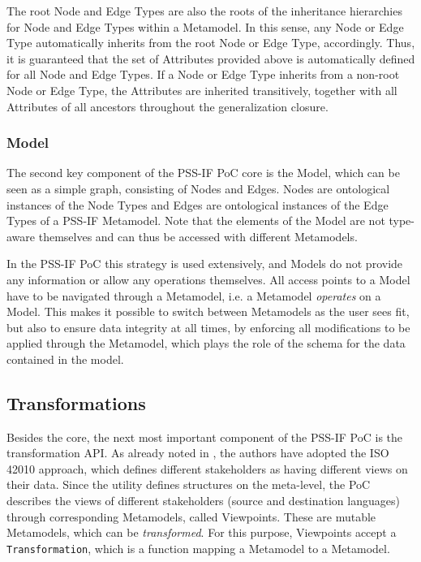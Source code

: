 The root Node and Edge Types are also the roots of the inheritance hierarchies for Node and Edge Types within a Metamodel. In this sense, any Node or Edge Type automatically inherits from the root Node or Edge Type, accordingly. Thus, it is guaranteed that the set of Attributes provided above is automatically defined for all Node and Edge Types. If a Node or Edge Type inherits from a non-root Node or Edge Type, the Attributes are inherited transitively, together with all Attributes of all ancestors throughout the generalization closure.

\subsubsection{Model}

The second key component of the PSS-IF PoC core is the Model, which can be seen as a simple graph, consisting of Nodes and Edges. Nodes are ontological instances of the Node Types and Edges are ontological instances of the Edge Types of a PSS-IF Metamodel. Note that the elements of the Model are not type-aware themselves and can thus be accessed with different Metamodels.

In the PSS-IF PoC this strategy is used extensively, and Models do not provide any information or allow any operations themselves. All access points to a Model have to be navigated through a Metamodel, i.e. a Metamodel \textit{operates} on a Model. This makes it possible to switch between Metamodels as the user sees fit, but also to ensure data integrity at all times, by enforcing all modifications to be applied through the Metamodel, which plays the role of the schema for the data contained in the model.

\subsection{Transformations}

Besides the core, the next most important component of the PSS-IF PoC is the transformation API. As already noted in , the authors have adopted the ISO 42010 approach, which defines different stakeholders as having different views on their data. Since the utility defines structures on the meta-level, the PoC describes the views of different stakeholders (source and destination languages) through corresponding Metamodels, called Viewpoints. These are mutable Metamodels, which can be \textit{transformed}. For this purpose, Viewpoints accept a \texttt{Transformation}, which is a function mapping a Metamodel to a Metamodel.

